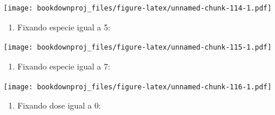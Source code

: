 \documentclass[
]{article}
\newenvironment{Shaded}{\begin{snugshade}}{\end{snugshade}}
\newcommand{\DataTypeTok}[1]{\textcolor[rgb]{0.13,0.29,0.53}{#1}}
\newcommand{\DecValTok}[1]{\textcolor[rgb]{0.00,0.00,0.81}{#1}}
\newcommand{\KeywordTok}[1]{\textcolor[rgb]{0.13,0.29,0.53}{\textbf{#1}}}
\newcommand{\NormalTok}[1]{#1}
\newcommand{\OperatorTok}[1]{\textcolor[rgb]{0.81,0.36,0.00}{\textbf{#1}}}
\newcommand{\StringTok}[1]{\textcolor[rgb]{0.31,0.60,0.02}{#1}}
\providecommand{\tightlist}{%
  \setlength{\itemsep}{0pt}\setlength{\parskip}{0pt}}
\begin{document}
\begin{Shaded}
\end{Shaded}

\texttt{[image: bookdownproj\_files/figure-latex/unnamed-chunk-114-1.pdf]}

\begin{enumerate}
\def\labelenumi{\arabic{enumi}.}
\setcounter{enumi}{5}
\tightlist
\item
  Fixando especie igual a 5:
\end{enumerate}

\begin{Shaded}
\end{Shaded}

\texttt{[image: bookdownproj\_files/figure-latex/unnamed-chunk-115-1.pdf]}

\begin{enumerate}
\def\labelenumi{\arabic{enumi}.}
\setcounter{enumi}{6}
\tightlist
\item
  Fixando especie igual a 7:
\end{enumerate}

\begin{Shaded}
\end{Shaded}

\texttt{[image: bookdownproj\_files/figure-latex/unnamed-chunk-116-1.pdf]}

\begin{enumerate}
\def\labelenumi{\arabic{enumi}.}
\setcounter{enumi}{7}
\tightlist
\item
  Fixando dose igual a 0:
\end{enumerate}
\end{document}
